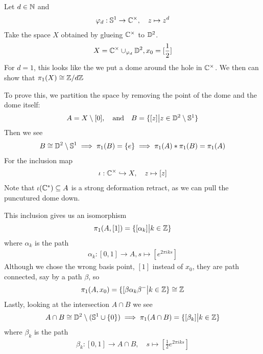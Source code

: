 \begin{ex}
  Let $d \in \mathbb{N}$ and 
  \begin{align*}
    \varphi_d: \mathbb{S}^{1} \to \mathbb{C}^{\times}, \quad z \mapsto  z^{d}
  \end{align*}
  Take the space $X$ obtained by glueing $\mathbb{C}^{\times}$ to $\mathbb{D}^{2}$.
  \begin{align*}
    X = \mathbb{C}^{\times} \cup_{\varphi_d} \mathbb{D}^{2}, x_0 = [\frac{1}{2}]  
  \end{align*}
  For $d=1$, this looks like the we put a dome around the hole in $\mathbb{C}^{\times}$.
  We then can show that $\pi_1(X) \cong \mathbb{Z}/d\mathbb{Z}$

  To prove this, we partition the space by removing the point of the dome and the dome itself:
  \begin{align*}
    A = X \setminus [0], \quad \text{and} \quad B = \{[z] \big\vert z \in \mathbb{D}^{2} \setminus \mathbb{S}^{1}\}
  \end{align*}
  Then we see
  \begin{align*}
    B \cong \mathbb{D}^{2} \setminus \mathbb{S}^{1} \implies \pi_1(B) = \{e\} \implies \pi_1(A) \ast \pi_1(B) = \pi_1(A)
  \end{align*}
  For the inclusion map
  \begin{align*}
    \iota: \mathbb{C}^{\times} \hookrightarrow X, \quad z \mapsto  [z]
  \end{align*}
  Note that $\iota(\mathbb{C}^{\ast}) \subseteq A$ is a strong deformation retract, as we can pull the puncutured dome down.

  This inclusion gives us an isomorphism
  \begin{align*}
    \pi_1(A,[1]) = \{[\alpha_k] \big\vert k \in \mathbb{Z}\}
  \end{align*}
  where $\alpha_k$ is the path
  \begin{align*}
    \alpha_k: [0,1] \to  A, s \mapsto  [e^{2 \pi i k s}]
  \end{align*}
  Although we chose the wrong basis point, $[1]$ instead of $x_0$, they are path connected, say by a path $\beta$, so
  \begin{align*}
    \pi_1(A,x_0) = \{[\beta \alpha_k \beta^{-} \big\vert k \in \mathbb{Z}\} \cong \mathbb{Z}
  \end{align*}
  Lastly, looking at the intersection $A \cap B$ we see
  \begin{align*}
    A \cap B \cong \mathbb{D}^{2} \setminus (\mathbb{S}^{1} \cup \{0\}) \implies \pi_1(A \cap B) = \{[\beta_k] \big\vert k \in \mathbb{Z}\}
  \end{align*}
  where $\beta_k$ is the path
  \begin{align*}
    \beta_k: [0,1] \to  A \cap B, \quad s \mapsto [\frac{1}{2} e^{2 \pi i k s}]
  \end{align*}


\end{ex}
